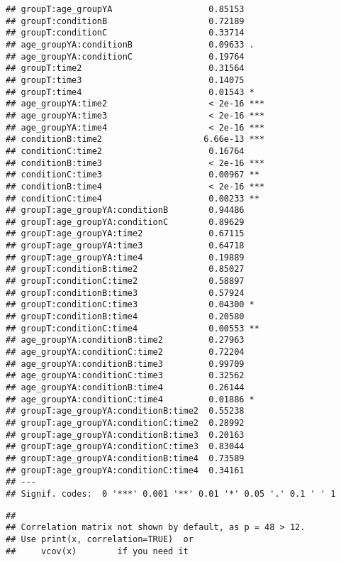 \documentclass[]{article}
\begin{document}
\begin{verbatim}
## groupT:age_groupYA                   0.85153    
## groupT:conditionB                    0.72189    
## groupT:conditionC                    0.33714    
## age_groupYA:conditionB               0.09633 .  
## age_groupYA:conditionC               0.19764    
## groupT:time2                         0.31564    
## groupT:time3                         0.14075    
## groupT:time4                         0.01543 *  
## age_groupYA:time2                    < 2e-16 ***
## age_groupYA:time3                    < 2e-16 ***
## age_groupYA:time4                    < 2e-16 ***
## conditionB:time2                    6.66e-13 ***
## conditionC:time2                     0.16764    
## conditionB:time3                     < 2e-16 ***
## conditionC:time3                     0.00967 ** 
## conditionB:time4                     < 2e-16 ***
## conditionC:time4                     0.00233 ** 
## groupT:age_groupYA:conditionB        0.94486    
## groupT:age_groupYA:conditionC        0.89629    
## groupT:age_groupYA:time2             0.67115    
## groupT:age_groupYA:time3             0.64718    
## groupT:age_groupYA:time4             0.19889    
## groupT:conditionB:time2              0.85027    
## groupT:conditionC:time2              0.58897    
## groupT:conditionB:time3              0.57924    
## groupT:conditionC:time3              0.04300 *  
## groupT:conditionB:time4              0.20580    
## groupT:conditionC:time4              0.00553 ** 
## age_groupYA:conditionB:time2         0.27963    
## age_groupYA:conditionC:time2         0.72204    
## age_groupYA:conditionB:time3         0.99709    
## age_groupYA:conditionC:time3         0.32562    
## age_groupYA:conditionB:time4         0.26144    
## age_groupYA:conditionC:time4         0.01886 *  
## groupT:age_groupYA:conditionB:time2  0.55238    
## groupT:age_groupYA:conditionC:time2  0.28992    
## groupT:age_groupYA:conditionB:time3  0.20163    
## groupT:age_groupYA:conditionC:time3  0.83044    
## groupT:age_groupYA:conditionB:time4  0.73589    
## groupT:age_groupYA:conditionC:time4  0.34161    
## ---
## Signif. codes:  0 '***' 0.001 '**' 0.01 '*' 0.05 '.' 0.1 ' ' 1
\end{verbatim}

\begin{verbatim}
## 
## Correlation matrix not shown by default, as p = 48 > 12.
## Use print(x, correlation=TRUE)  or
##     vcov(x)        if you need it
\end{verbatim}
\end{document}

